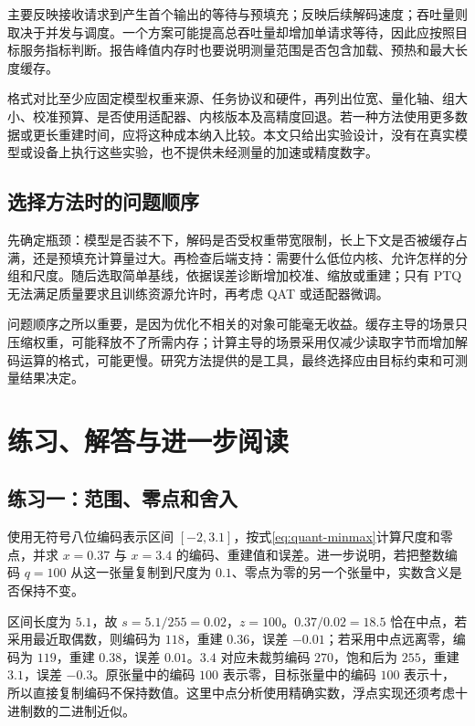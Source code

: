 \documentclass[UTF8,12pt,a4paper,fontset=fandol]{ctexart}
\begin{document}
主要反映接收请求到产生首个输出的等待与预填充；反映后续解码速度；吞吐量则取决于并发与调度。一个方案可能提高总吞吐量却增加单请求等待，因此应按照目标服务指标判断。报告峰值内存时也要说明测量范围是否包含加载、预热和最大长度缓存。

格式对比至少应固定模型权重来源、任务协议和硬件，再列出位宽、量化轴、组大小、校准预算、是否使用适配器、内核版本及高精度回退。若一种方法使用更多数据或更长重建时间，应将这种成本纳入比较。本文只给出实验设计，没有在真实模型或设备上执行这些实验，也不提供未经测量的加速或精度数字。

\subsection{选择方法时的问题顺序}
先确定瓶颈：模型是否装不下，解码是否受权重带宽限制，长上下文是否被缓存占满，还是预填充计算量过大。再检查后端支持：需要什么低位内核、允许怎样的分组和尺度。随后选取简单基线，依据误差诊断增加校准、缩放或重建；只有 PTQ 无法满足质量要求且训练资源允许时，再考虑 QAT 或适配器微调。

问题顺序之所以重要，是因为优化不相关的对象可能毫无收益。缓存主导的场景只压缩权重，可能释放不了所需内存；计算主导的场景采用仅减少读取字节而增加解码运算的格式，可能更慢。研究方法提供的是工具，最终选择应由目标约束和可测量结果决定。

\section{练习、解答与进一步阅读}
\label{sec:quant-exercises}

\subsection{练习一：范围、零点和舍入}
使用无符号八位编码表示区间 $[-2,3.1]$，按式\eqref{eq:quant-minmax}计算尺度和零点，并求 $x=0.37$ 与 $x=3.4$ 的编码、重建值和误差。进一步说明，若把整数编码 $q=100$ 从这一张量复制到尺度为 $0.1$、零点为零的另一个张量中，实数含义是否保持不变。

\begin{solve}
区间长度为 $5.1$，故 $s=5.1/255=0.02$，$z=100$。$0.37/0.02=18.5$ 恰在中点，若采用最近取偶数，则编码为 $118$，重建 $0.36$，误差 $-0.01$；若采用中点远离零，编码为 $119$，重建 $0.38$，误差 $0.01$。$3.4$ 对应未裁剪编码 $270$，饱和后为 $255$，重建 $3.1$，误差 $-0.3$。原张量中的编码 $100$ 表示零，目标张量中的编码 $100$ 表示十，所以直接复制编码不保持数值。这里中点分析使用精确实数，浮点实现还须考虑十进制数的二进制近似。
\end{solve}
\end{document}
